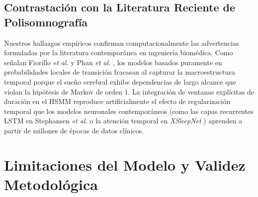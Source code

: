 \documentclass[11pt,a4paper]{article}
\begin{document}
\subsection{Contrastación con la Literatura Reciente de Polisomnografía}
Nuestros hallazgos empíricos confirman computacionalmente las advertencias formuladas por la literatura contemporánea en ingeniería biomédica. Como señalan Fiorillo \textit{et al.} \cite{fiorillo2021} y Phan \textit{et al.} \cite{phan2021}, los modelos basados puramente en probabilidades locales de transición fracasan al capturar la macroestructura temporal porque el sueño cerebral exhibe dependencias de largo alcance que violan la hipótesis de Markov de orden 1. La integración de ventanas explícitas de duración en el HSMM reproduce artificialmente el efecto de regularización temporal que los modelos neuronales contemporáneos (como las capas recurrentes LSTM en Stephansen \textit{et al.} \cite{stephansen2018} o la atención temporal en \textit{XSleepNet} \cite{phan2021}) aprenden a partir de millones de épocas de datos clínicos.

\section{Limitaciones del Modelo y Validez Metodológica}
\end{document}
